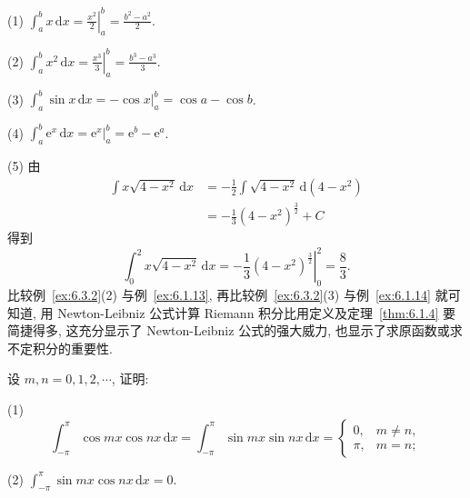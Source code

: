 \begin{solution}
(1) $\int_{a}^{b}x\,\mathrm{d}x=\left.\frac{x^{2}}{2}\right|_{a}^{b}=\frac{b^{2}-a^{2}}{2}$.

(2) $\int_{a}^{b}x^{2}\,\mathrm{d}x=\left.\frac{x^{3}}{3}\right|_{a}^{b}=\frac{b^{3}-a^{3}}{3}$.

(3) $\int_{a}^{b}\sin x\,\mathrm{d}x=-\cos x\Big|_{a}^{b}=\cos a-\cos b$.

(4) $\int_{a}^{b}\mathrm{e}^{x}\,\mathrm{d}x=\mathrm{e}^{x}\Big|_{a}^{b}=\mathrm{e}^{b}-\mathrm{e}^{a}$.

(5) 由
\[
\begin{aligned}
\int x\sqrt{4-x^{2}}\,\mathrm{d}x&=-\frac{1}{2}\int\sqrt{4-x^{2}}\,\mathrm{d}(4-x^{2})\\
&=-\frac{1}{3}(4-x^{2})^{\frac{3}{2}}+C
\end{aligned}
\]
得到
\[
\int_{0}^{2}x\sqrt{4-x^{2}}\,\mathrm{d}x=-\left.\frac{1}{3}(4-x^{2})^{\frac{3}{2}}\right|_{0}^{2}=\frac{8}{3}.
\]
比较例~\ref{ex:6.3.2}(2) 与例~\ref{ex:6.1.13}, 再比较例~\ref{ex:6.3.2}(3) 与例~\ref{ex:6.1.14} 就可知道, 用 Newton-Leibniz 公式计算 Riemann 积分比用定义及定理~\ref{thm:6.1.4} 要简捷得多, 这充分显示了 Newton-Leibniz 公式的强大威力, 也显示了求原函数或求不定积分的重要性.
\end{solution}

\begin{example}\label{ex:6.3.3}
设 $m,n=0,1,2,\cdots$, 证明:

(1)
\[
\int_{-\pi}^{\pi}\cos mx\cos nx\,\mathrm{d}x=\int_{-\pi}^{\pi}\sin mx\sin nx\,\mathrm{d}x=\begin{cases}0,&m\neq n,\\\pi,&m=n;\end{cases}
\]

(2) $\int_{-\pi}^{\pi}\sin mx\cos nx\,\mathrm{d}x=0$.
\end{example}

